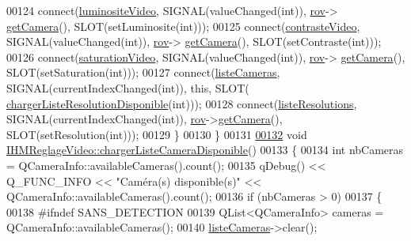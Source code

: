 \begin{DoxyCode}
00124         connect(\hyperlink{class_i_h_m_reglage_video_a9109c0801d582917e78e57c350510ea7}{luminositeVideo}, SIGNAL(valueChanged(\textcolor{keywordtype}{int})), \hyperlink{class_i_h_m_reglage_video_a755736fe361e651453de6bc21725a626}{rov}->
      \hyperlink{class_rov_ac1eeb568d39018359b89384c2ee6ee86}{getCamera}(), SLOT(setLuminosite(\textcolor{keywordtype}{int})));
00125         connect(\hyperlink{class_i_h_m_reglage_video_a617e9dbd5a92c35e7e351228354deb63}{contrasteVideo}, SIGNAL(valueChanged(\textcolor{keywordtype}{int})), \hyperlink{class_i_h_m_reglage_video_a755736fe361e651453de6bc21725a626}{rov}->
      \hyperlink{class_rov_ac1eeb568d39018359b89384c2ee6ee86}{getCamera}(), SLOT(setContraste(\textcolor{keywordtype}{int})));
00126         connect(\hyperlink{class_i_h_m_reglage_video_a058bd2a65aefa5f95ff73851f156064c}{saturationVideo}, SIGNAL(valueChanged(\textcolor{keywordtype}{int})), \hyperlink{class_i_h_m_reglage_video_a755736fe361e651453de6bc21725a626}{rov}->
      \hyperlink{class_rov_ac1eeb568d39018359b89384c2ee6ee86}{getCamera}(), SLOT(setSaturation(\textcolor{keywordtype}{int})));
00127         connect(\hyperlink{class_i_h_m_reglage_video_a38a35548ddd0e5750917305ac6f32142}{listeCameras}, SIGNAL(currentIndexChanged(\textcolor{keywordtype}{int})), \textcolor{keyword}{this}, SLOT(
      \hyperlink{class_i_h_m_reglage_video_a26dc15cf9453af24c464f0d6aebb42df}{chargerListeResolutionDisponible}(\textcolor{keywordtype}{int})));
00128         connect(\hyperlink{class_i_h_m_reglage_video_ad897355a4350d95f5f219db57ff68d4f}{listeResolutions}, SIGNAL(currentIndexChanged(\textcolor{keywordtype}{int})), 
      \hyperlink{class_i_h_m_reglage_video_a755736fe361e651453de6bc21725a626}{rov}->\hyperlink{class_rov_ac1eeb568d39018359b89384c2ee6ee86}{getCamera}(), SLOT(setResolution(\textcolor{keywordtype}{int})));
00129     \}
00130 \}
00131 
\hyperlink{class_i_h_m_reglage_video_a0a480faa747bc705b4cf49df4ecc1d44}{00132} \textcolor{keywordtype}{void} \hyperlink{class_i_h_m_reglage_video_a0a480faa747bc705b4cf49df4ecc1d44}{IHMReglageVideo::chargerListeCameraDisponible}()
00133 \{
00134     \textcolor{keywordtype}{int} nbCameras = QCameraInfo::availableCameras().count();
00135     qDebug() << Q\_FUNC\_INFO << \textcolor{stringliteral}{"Caméra(s) disponible(s)"} << QCameraInfo::availableCameras().count();    
00136     \textcolor{keywordflow}{if} (nbCameras > 0)
00137     \{
00138 \textcolor{preprocessor}{       #ifndef SANS\_DETECTION}
00139        QList<QCameraInfo> cameras = QCameraInfo::availableCameras();
00140        \hyperlink{class_i_h_m_reglage_video_a38a35548ddd0e5750917305ac6f32142}{listeCameras}->clear();

\end{DoxyCode}
